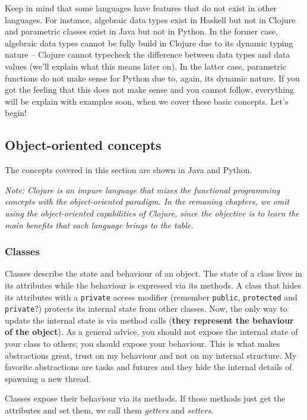 \documentclass[]{article}
\begin{document}
Keep in mind that some languages have features that do not exist in
other languages. For instance, algebraic data types exist in Haskell but
not in Clojure and parametric classes exist in Java but not in Python.
In the former case, algebraic data types cannot be fully build in
Clojure due to its dynamic typing nature -- Clojure cannot typecheck the
difference between data types and data values (we'll explain what this
means later on). In the latter case, parametric functions do not make
sense for Python due to, again, its dynamic nature. If you got the
feeling that this does not make sense and you cannot follow, everything
will be explain with examples soon, when we cover these basic concepts.
Let's begin!

\subsection{Object-oriented concepts}\label{object-oriented-concepts}

The concepts covered in this section are shown in Java and Python.

\emph{Note: Clojure is an impure language that mixes the functional
programming concepts with the object-oriented paradigm. In the remaning
chapters, we omit using the object-oriented capabilities of Clojure,
since the objective is to learn the main benefits that each language
brings to the table.}

\hypertarget{classes}{\subsubsection{Classes}\label{classes}}

Classes describe the state and behaviour of an object. The state of a
class lives in its attributes while the behaviour is expressed via its
methods. A class that hides its attributes with a \texttt{private}
access modifier (remember \texttt{public}, \texttt{protected} and
\texttt{private}?) protects its internal state from other classes. Now,
the only way to update the internal state is via method calls
(\textbf{they represent the behaviour of the object}). As a general
advice, you should not expose the internal state of your class to
others; you should expose your behaviour. This is what makes
abstractions great, trust on my behaviour and not on my internal
structure. My favorite abstractions are tasks and futures and they hide
the internal details of spawning a new thread.

Classes expose their behaviour via its methods. If those methods just
get the attributes and set them, we call them \emph{getters} and
\emph{setters}.
\end{document}
